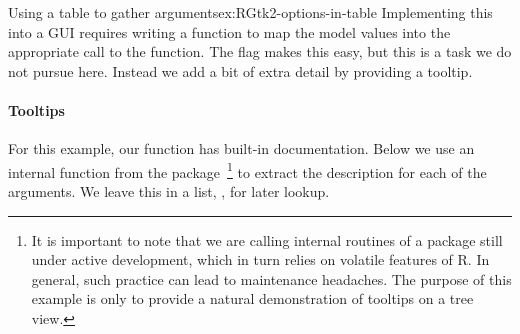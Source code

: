 \begin{example}{Using a table to gather arguments}{ex:RGtk2-options-in-table}
Implementing this into a GUI requires writing a function to map the
model values into the appropriate call to the  function. The
 flag makes this easy, but this is a task we do not pursue
here. Instead we add a bit of extra detail by providing a tooltip.

\paragraph{Tooltips}
For this example, our function has built-in documentation. Below we
use an internal function from the  package~\footnote{It is
  important to note that we are calling internal routines of a package
  still under active development, which in turn relies on volatile
  features of R. In general, such practice can lead to maintenance
  headaches.  The purpose of this example is only to provide a natural
  demonstration of tooltips on a tree view.} to extract the
description for each of the arguments. We leave this in a list,
, for later lookup.
\begin{Schunk}
\end{Schunk}


\end{example}
